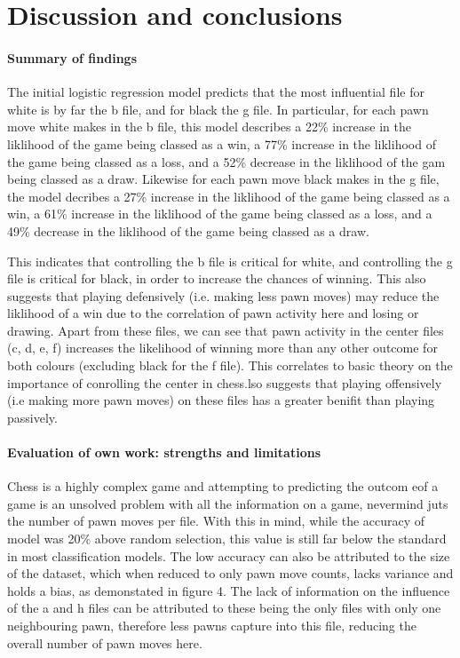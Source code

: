 \documentclass[11pt,a4paper]{article}
\begin{document}
\section{Discussion and conclusions}


\paragraph{Summary of findings}
The initial logistic regression model predicts that the most influential file for white is by far the b file, and for black the g file.
In particular, for each pawn move white makes in the b file, this model describes a 22\% increase in the liklihood of the game being classed as a win, 
a 77\% increase in the liklihood of the game being classed as a loss, and a 52\% decrease in the liklihood of the gam being classed as a draw.
Likewise for each pawn move black makes in the g file, the model decribes a 27\% increase in the liklihood of the game being classed as a win, a 61\% increase in 
the liklihood of the game being classed as a loss, and a 49\% decrease in the liklihood of the game being classed as a draw. 

This indicates that controlling the b file is critical for white, and controlling the g file is critical for black, in order to increase the chances of winning. 
This also suggests that playing defensively (i.e. making less pawn moves) may reduce the liklihood of a win due to the correlation of pawn activity here and losing 
or drawing. 
Apart from these files, we can see that pawn activity in the center files (c, d, e, f) increases the likelihood of winning more than any other outcome for both 
colours (excluding black for the f file). This correlates to basic theory on the importance of conrolling the center in chess.lso suggests that playing offensively 
(i.e making more pawn moves) on these files has a greater benifit than playing passively.




\paragraph{Evaluation of own work: strengths and limitations}
Chess is a highly complex game and attempting to predicting the outcom eof a game is an unsolved problem with all the information on a game, nevermind juts the number of pawn moves per file. With this in mind, while the accuracy of model was 20\% above random selection, this value is still far below the standard in most classification models.
The low accuracy can also be attributed to the size of the dataset, which when reduced to only pawn move counts, lacks variance and holds a bias, as demonstated in figure 4. 
The lack of information on the influence of the a and h files can be attributed to these being the only files with only one neighbouring pawn, therefore less pawns capture into this file, reducing the overall number of pawn moves here. 
\end{document}
